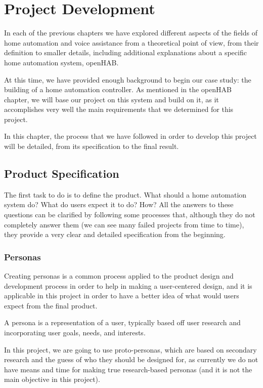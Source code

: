 \chapter{Project Development}

In each of the previous chapters we have explored different aspects of the fields of home automation and voice assistance from a
theoretical point of view, from their definition to smaller details, including additional explanations about a specific home automation
system, openHAB.

At this time, we have provided enough background to begin our case study: the building of a home automation controller. As
mentioned in the openHAB chapter, we will base our project on this system and build on it, as it accomplishes very well the main
requirements that we determined for this project.

In this chapter, the process that we have followed in order to develop this project will be detailed, from its specification to
the final result.

\section{Product Specification}
The first task to do is to define the product. What should a home automation system do? What do users expect it to do? How? All
the answers to these questions can be clarified by following some processes that, although they do not completely answer them (we
can see many failed projects from time to time), they provide a very clear and detailed specification from the beginning.

\subsection{Personas}
Creating personas is a common process applied to the product design and development process in order to help in making a user-centered
design, and it is applicable in this project in order to have a better idea of what would users expect from the final product.

A persona is a representation of a user, typically based off user research and incorporating user goals, needs, and interests.

In this project, we are going to use proto-personas, which are based on secondary research and the guess of who they should be designed
for, as currently we do not have means and time for making true research-based personas (and it is not the main objective in this project).

